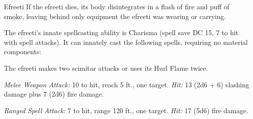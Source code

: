 \documentclass[10pt,a4paper,twoside,bg=print,twocolumn,openany,nodeprecatedcode]{dndbook}
\begin{document}
\begin{DndMonster}[float=t]{Efreeti}
\DndMonsterBasics[
armor-class = {17 (natural armor)},
hit-points = {\DndDice{16d10 + 112}},
speed = {40 ft., fly 60 ft.}
]
\DndMonsterAbilityScores[
 str = 22,
 dex = 12,
 con = 24,
 int = 16,
 wis = 15,
 cha = 16
]
\DndMonsterDetails[
saving-throws = {Int +7, Wis +6, Cha +7},
damage-immunities = {fire},
senses = {darkvision 120 ft., passive perception 12},
languages = {Ignan},
challenge = 11,
]
If the efreeti dies, its body disintegrates in a flash of fire and puff of smoke, leaving behind only equipment the efreeti was wearing or carrying.

The efreeti's innate spellcasting ability is Charisma (spell save DC 15, 7 to hit with spell attacks). It can innately cast the following spells, requiring no material components:
\begin{DndMonsterSpells}
\end{DndMonsterSpells}
The efreeti makes two scimitar attacks or uses its Hurl Flame twice.

\textsl{Melee Weapon Attack:} 10 to hit, reach 5 ft., one target. \textsl{Hit:} 13 (2d6 + 6) slashing damage plus 7 (2d6) fire damage.

\textsl{Ranged Spell Attack:} 7 to hit, range 120 ft., one target. \textsl{Hit:} 17 (5d6) fire damage.

\end{DndMonster}
\end{document}
